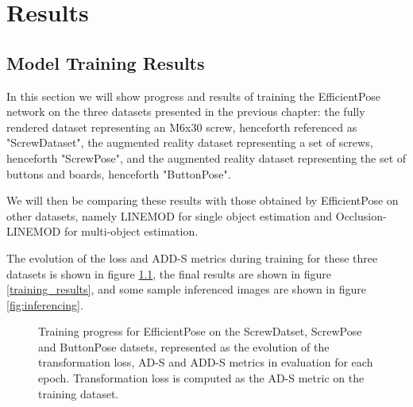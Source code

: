 \chapter{Results}

\section{Model Training Results}

In this section we will show progress and results of training the EfficientPose network on the three datasets presented in the previous chapter: the fully rendered dataset representing an M6x30 screw, henceforth referenced as "ScrewDataset", the augmented reality dataset representing a set of screws, henceforth "ScrewPose", and the augmented reality dataset representing the set of buttons and boards, henceforth "ButtonPose".

We will then be comparing these results with those obtained by EfficientPose on other datasets, namely LINEMOD for single object estimation and Occlusion-LINEMOD for multi-object estimation.

The evolution of the loss and ADD-S metrics during training for these three datasets is shown in figure \ref{fig:training_progress}, the final results are shown in figure \ref{training_results}, and some sample inferenced images are shown in figure \ref{fig:inferencing}.

\begin{figure}[htp]



    \caption{Training progress for EfficientPose on the ScrewDatset, ScrewPose and ButtonPose datsets, represented as the evolution of the transformation loss, AD-S and ADD-S metrics in evaluation for each epoch. Transformation loss is computed as the AD-S metric on the training dataset.}
    \label{fig:training_progress}
\end{figure}

